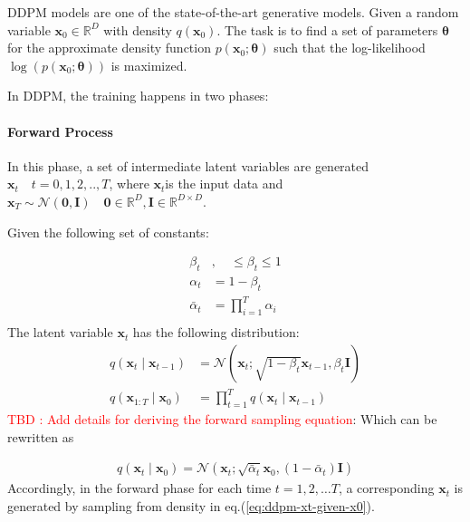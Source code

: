 \documentclass[11pt]{article}
\begin{document}
    DDPM models are one of the state-of-the-art generative models\cite{ho2020denoising}.
    Given a random variable $\mathbf{x}_0 \in \mathbb{R}^{D} $ with density $q(\mathbf{x}_0)$. The task is to
    find a set of parameters $\bm{\theta}$ for the approximate density function $p(\mathbf{x}_0;\bm{\theta})$
    such that the log-likelihood $ \log(p(\mathbf{x}_0;\bm{\theta}))$ is maximized.

    In DDPM, the training happens in two phases:

    \paragraph{Forward Process}
    In this phase, a set of intermediate latent variables are generated $\mathbf{x}_t \quad t={0,1,2,..,T}$, where
    $\mathbf{x}_t$is the input data and $\mathbf{x}_T \sim \mathcal{N}(\mathbf{0},\mathbf{I})
    \quad \mathbf{0} \in \mathbb{R}^{D}, \mathbf{I} \in \mathbb{R}^{D \times D}$.\par
    Given the following set of constants:

    \begin{equation}
        \begin{aligned}
            \beta_t &, \quad \leq \beta_t \leq 1 \\
            \alpha_t &= 1-\beta_t \\
            \bar{\alpha}_t &= \prod_{i=1}^{T} \alpha_i \\
        \end{aligned}
        \label{eq:ddpm-constants}
    \end{equation}
    The latent variable $\mathbf{x}_t$ has the following distribution:
    \begin{equation}
        \label{eq:ddpm-xt-given-xt-minus-1}
        \begin{aligned}
            q\left(\mathbf{x}_t \mid \mathbf{x}_{t-1}\right) &=\mathcal{N}\left(\mathbf{x}_t ;
            \sqrt{1-\beta_t} \mathbf{x}_{t-1}, \beta_t \mathbf{I}\right) \\
            q\left(\mathbf{x}_{1: T} \mid \mathbf{x}_0\right) &=\prod_{t=1}^T q\left(\mathbf{x}_t \mid \mathbf{x}_{t-1}\right)
        \end{aligned}
    \end{equation}
    \textcolor{red}{TBD : Add details for deriving the forward sampling equation}:
    Which can be rewritten as

    \begin{equation}
        \label{eq:ddpm-xt-given-x0}
        \begin{aligned}
            q\left(\mathbf{x}_t \mid \mathbf{x}_0\right)=\mathcal{N}\left(\mathbf{x}_t ;
            \sqrt{\bar{\alpha}_t} \mathbf{x}_0,\left(1-\bar{\alpha}_t\right) \mathbf{I}\right)
        \end{aligned}
    \end{equation}
    Accordingly, in the forward phase for each time $t=1,2,\dots T$, a corresponding $\mathbf{x}_t$ is generated by
    sampling from density in eq.(\ref{eq:ddpm-xt-given-x0}).
\end{document}

